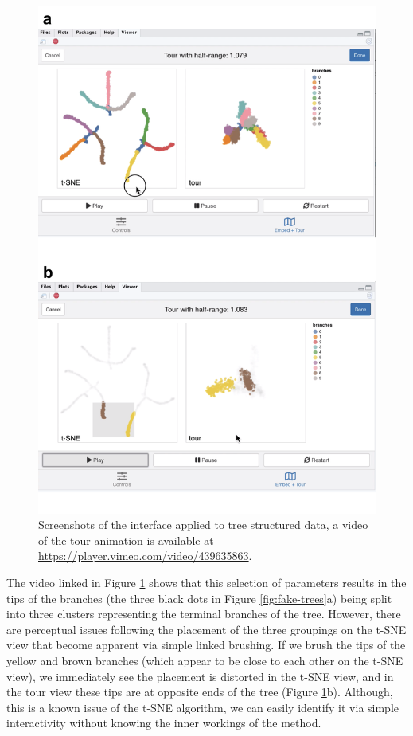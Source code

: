 \documentclass[article,notitle]{jdssv}
\begin{document}
\begin{figure}

{\centering \includegraphics[width=\textwidth]{./img/liminal-screenshot-trees-02} 

}

\caption{Screenshots of the  interface applied to tree structured data, a video of the tour animation is available at \url{https://player.vimeo.com/video/439635863}.}\label{fig:trees-02}
\end{figure}

The video linked in Figure \ref{fig:trees-02} shows that this selection of
parameters results in the
tips of the branches (the three black dots in Figure \ref{fig:fake-trees}a)
being split into three clusters representing the terminal branches of the tree.
However, there are perceptual issues following the placement of the three
groupings on the t-SNE view that become apparent via simple linked brushing.
If we brush the
tips of the yellow and brown branches (which appear to be close to each other
on the t-SNE view), we immediately see the placement is distorted in the t-SNE
view, and in the tour view these tips are at opposite ends of the tree
(Figure \ref{fig:trees-02}b).
Although, this is a known issue of the t-SNE algorithm, we can easily identify
it via simple interactivity without knowing the inner workings of the method.
\end{document}
